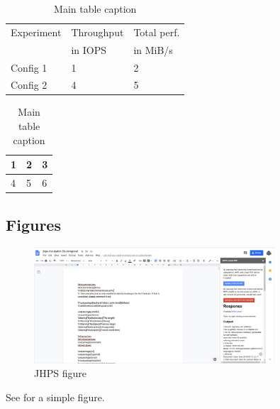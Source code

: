 \documentclass{jhps}
\begin{document}
\begin{table}
  \centering
	\begin{subtable}[t]{8cm}
		\centering
		\begin{tabular}{l|l|l}
       \rowcolor{tblhead} Experiment  & Throughput & Total perf. \\
       \rowcolor{tblhead}   & in IOPS & in MiB/s \\
     \hline
     \hline
		 Config 1 & 1   &  2   \\
		\hline
		 Config 2 & 4   &  5   \\
		\end{tabular}
		\caption{Caption 1}\label{tbl:1a}
	\end{subtable}
	\begin{subtable}[t]{3cm}
		\centering
		\begin{tabular}{|l|l|l|}
		\hline
		 1   &  2   &  3  \\
		\hline
		 4   &  5   &  6  \\
		\hline
		\end{tabular}
		\caption{Caption 2}\label{tbl:1b}
	\end{subtable}
	\caption{Main table caption}\label{tbl:1}
\end{table}

\subsection{Figures}

\begin{figure} %
\includegraphics[width=0.8\textwidth]{jhps}
\caption{JHPS figure}
\label{fig:jhps}
\end{figure}

See  for a simple figure.
\end{document}
